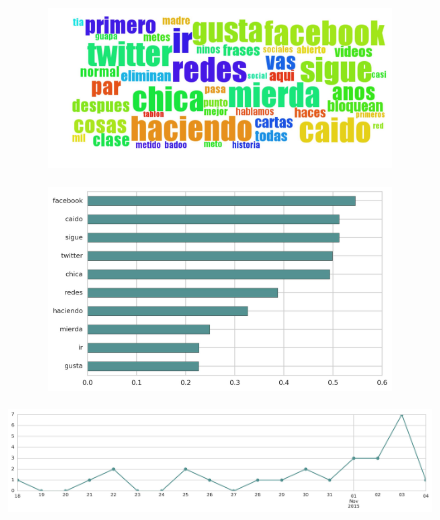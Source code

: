 \begin{figure}[htbp!]
    \centering
    \begin{subfigure}[b]{0.49\textwidth}
        \includegraphics[width=\textwidth]{twitter_murcia/report_images/topic-02-wordcloud.jpg}
    \end{subfigure}
    \begin{subfigure}[b]{0.49\textwidth}
        \includegraphics[width=\textwidth]{twitter_murcia/report_images/topic-02-terms.jpg}
    \end{subfigure}
\end{figure}

\begin{figure}[htbp!]
    \centering
    \includegraphics[width=\textwidth]{twitter_murcia/report_images/topic-02-timeseries.jpg}
\end{figure}

